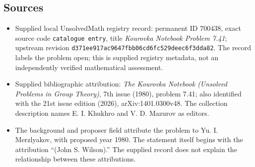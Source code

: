 \documentclass[11pt]{article}
\begin{document}
\subsection{Sources}
\begin{itemize}
\item Supplied local UnsolvedMath registry record: permanent ID \(700438\), exact source code \texttt{catalogue entry}, title \emph{Kourovka Notebook Problem 7.41}; upstream revision \texttt{d371ee917ac9647fbb06cd6fc529deec6f3dda82}. The record labels the problem open; this is supplied registry metadata, not an independently verified mathematical assessment.
\item Supplied bibliographic attribution: \emph{The Kourovka Notebook (Unsolved Problems in Group Theory)}, 7th issue (1980), problem 7.41; also identified with the 21st issue edition (2026), arXiv:1401.0300v48. The collection description names E. I. Khukhro and V. D. Mazurov as editors.
\item The background and proposer field attribute the problem to Yu. I. Merzlyakov, with proposed year 1980. The statement itself begins with the attribution ``(John S. Wilson).'' The supplied record does not explain the relationship between these attributions.
\end{itemize}
\end{document}
